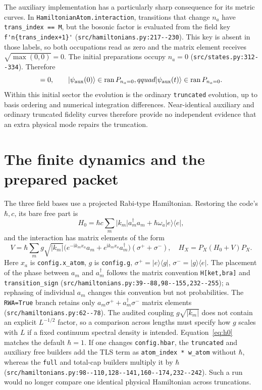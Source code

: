 \documentclass[11pt,a4paper]{article}
\newcommand{\ket}[1]{\lvert #1\rangle}
\newcommand{\bra}[1]{\langle #1\rvert}
\newcommand{\code}[1]{\nolinkurl{#1}}
\newcommand{\ii}{\mathrm i}
\begin{document}
The auxiliary implementation has a particularly sharp consequence for its metric curves. In \code{HamiltonianAtom.interaction}, transitions that change $n_a$ have \code{trans_index == M}, but the bosonic factor is evaluated from the field key \code{f'n{trans_index+1}'} (\code{src/hamiltonians.py:217--230}). This key is absent in those labels, so both occupations read as zero and the matrix element receives $\sqrt{\max(0,0)}=0$. The initial preparations occupy $n_a=0$ (\code{src/states.py:312--334}). Therefore
\begin{equation}
 [H_{\rm aux},P_{n_a=0}]=0,\qquad
 \ket{\psi_{\rm aux}(0)}\in\operatorname{ran}P_{n_a=0},qquad
 \ket{\psi_{\rm aux}(t)}\in\operatorname{ran}P_{n_a=0}.
 \label{eq:auxinvariant}
\end{equation}
Within this initial sector the evolution is the ordinary \code{truncated} evolution, up to basis ordering and numerical integration differences. Near-identical auxiliary and ordinary truncated fidelity curves therefore provide no independent evidence that an extra physical mode repairs the truncation.

\section{The finite dynamics and the prepared packet}
\label{sec:model}
The three field bases use a projected Rabi-type Hamiltonian. Restoring the code's $\hbar,c$, its bare free part is
\begin{equation}
 H_0=\hbar c\sum_m|k_m|a_m^\dagger a_m+
 \hbar\omega_a\ket e\bra e,
 \label{eq:h0}
\end{equation}
and the interaction has matrix elements of the form
\begin{equation}
 V=\hbar\sum_m g\sqrt{|k_m|}
 \bigl(e^{-\ii k_m x_a}a_m+e^{\ii k_m x_a}a_m^\dagger\bigr)
 (\sigma^++\sigma^-),
 \quad H_X=P_X(H_0+V)P_X.
 \label{eq:h}
\end{equation}
Here $x_a$ is \code{config.x_atom}, $g$ is \code{config.g}, $\sigma^+=\ket e\bra g$, $\sigma^-=\ket g\bra e$. The placement of the phase between $a_m$ and $a_m^\dagger$ follows the matrix convention \code{H[ket,bra]} and \code{transition_sign} (\code{src/hamiltonians.py:39--88,98--155,232--255}); a rephasing of individual $a_m$ changes this convention but not probabilities. The \code{RWA=True} branch retains only $a_m\sigma^++a_m^\dagger\sigma^-$ matrix elements (\code{src/hamiltonians.py:62--78}). The audited coupling $g\sqrt{|k_m|}$ does not contain an explicit $L^{-1/2}$ factor, so a comparison across lengths must specify how $g$ scales with $L$ if a fixed continuum spectral density is intended.
Equation~\eqref{eq:h0} matches the default $\hbar=1$. If one changes \code{config.hbar}, the \code{truncated} and auxiliary free builders add the TLS term as \code{atom_index * w_atom} without $\hbar$, whereas the \code{full} and total-cap builders multiply it by $\hbar$ (\code{src/hamiltonians.py:98--110,128--141,160--174,232--242}). Such a run would no longer compare one identical physical Hamiltonian across truncations.
\end{document}
